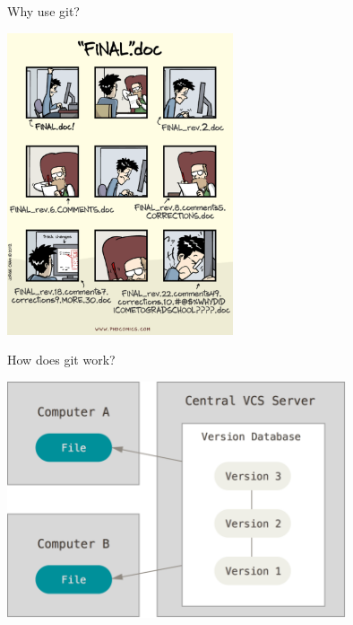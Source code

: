 \documentclass[12pt]{beamer}
\begin{document}
\begin{frame}

	\begin{flushright}
		\Large \textcolor{boss2}{Why use git?} 
	\end{flushright}

	\begin{center}
	  \includegraphics[width=0.5\textwidth]{figs/phd101212s.pdf}
	\end{center}

\end{frame}






\begin{frame}

	\begin{flushright}
		\Large \textcolor{boss2}{How does git work?} 
	\end{flushright}

	\begin{center}
	  \includegraphics[width=0.75\textwidth]{figs/centralized.png}
	\end{center}

\end{frame}
\end{document}
